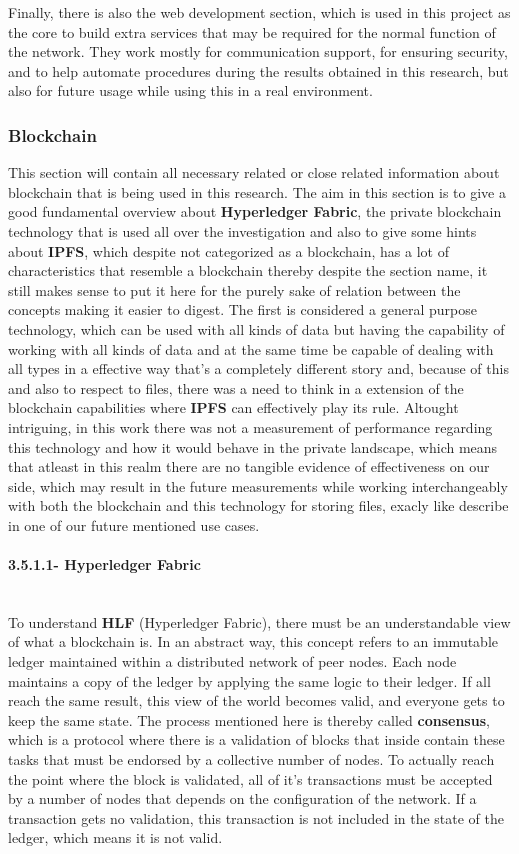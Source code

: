 Finally, there is also the web development section, which is used in this project as the core to build extra services that may be required for the normal function of the network. They work mostly for communication support, for ensuring security, and to help automate procedures during the results obtained in this research, but also for future usage while using this in a real environment.


\subsubsection{Blockchain}
This section will contain all necessary related or close related information about blockchain that is being used in this research. The aim in this section is to give a good fundamental overview about \textbf{Hyperledger Fabric}, the private blockchain technology that is used all over the investigation and also to give some hints about \textbf{IPFS}, which despite not categorized as a blockchain, has a lot of characteristics that resemble a blockchain thereby despite the section name, it still makes sense to put it here for the purely sake of relation between the concepts making it easier to digest. The first is considered a general purpose technology, which can be used with all kinds of data but having the capability of working with all kinds of data and at the same time be capable of dealing with all types in a effective way that's a completely different story and, because of this and also to respect to files, there was a need to think in a extension of the blockchain capabilities where \textbf{IPFS} can effectively play its rule. Altought intriguing, in this work there was not a measurement of performance regarding this technology and how it would behave in the private landscape, which means that atleast in this realm there are no tangible evidence of effectiveness on our side, which may result in the future measurements while working interchangeably with both the blockchain and this technology for storing files, exacly like describe in one of our future mentioned use cases.

\paragraph{3.5.1.1- Hyperledger Fabric}\mbox{}\\
To understand \textbf{HLF} (Hyperledger Fabric), there must be an understandable view of what a blockchain is. In an abstract way, this concept refers to an immutable ledger maintained within a distributed network of peer nodes. Each node maintains a copy of the ledger by applying the same logic to their ledger. If all reach the same result, this view of the world becomes valid, and everyone gets to keep the same state. The process mentioned here is thereby called \textbf{consensus}, which is a protocol where there is a validation of blocks that inside contain these tasks that must be endorsed by a collective number of nodes. To actually reach the point where the block is validated, all of it's transactions must be accepted by a number of nodes that depends on the configuration of the network. If a transaction gets no validation, this transaction is not included in the state of the ledger, which means it is not valid.

